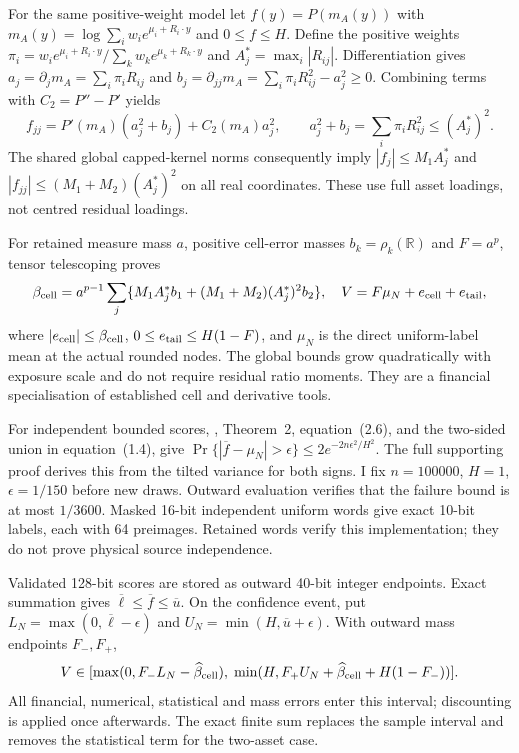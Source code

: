 \documentclass[11pt]{article}
\newcommand{\R}{\mathbb R}
\begin{document}
For the same positive-weight model let $f(y)=P(m_A(y))$ with
$m_A(y)=\log\sum_iw_i e^{\mu_i+R_i\cdot y}$ and $0\leq f\leq H$.
Define the positive weights $\pi_i=w_i e^{\mu_i+R_i\cdot y}/
\sum_kw_k e^{\mu_k+R_k\cdot y}$ and $A_j^*=\max_i|R_{ij}|$.
Differentiation gives $a_j=\partial_jm_A=\sum_i\pi_iR_{ij}$ and
$b_j=\partial_{jj}m_A=\sum_i\pi_iR_{ij}^2-a_j^2\geq0$. Combining
terms with $C_2=P''-P'$ yields
\begin{equation}
 f_{jj}=P'(m_A)(a_j^2+b_j)+C_2(m_A)a_j^2,
 \qquad a_j^2+b_j=\sum_i\pi_iR_{ij}^2\leq(A_j^*)^2.
\end{equation}
The shared global capped-kernel norms consequently imply
$|f_j|\leq M_1A_j^*$ and
$|f_{jj}|\leq(M_1+M_2)(A_j^*)^2$ on all real coordinates.
These use full asset loadings, not centred residual loadings.

For retained measure mass $a$, positive cell-error masses
$b_k=\rho_k(\R)$ and $F=a^p$, tensor telescoping proves
\begin{equation}
 \beta_{\rm cell}=a^{p-1}\sum_j
 \{M_1A_j^*b_1+(M_1+M_2)(A_j^*)^2b_2\},\quad
 V=F\mu_N+e_{\rm cell}+e_{\rm tail},
\end{equation}
where $|e_{\rm cell}|\leq\beta_{\rm cell}$,
$0\leq e_{\rm tail}\leq H(1-F)$, and $\mu_N$ is the direct
uniform-label mean at the actual rounded nodes. The global bounds grow
quadratically with exposure scale and do not require residual ratio moments.
They are a financial specialisation of established cell and derivative tools.

For independent bounded scores, \citet{hoeffding1963}, Theorem~2,
equation~(2.6), and the two-sided union in equation~(1.4), give
$\Pr\{|\overline f-\mu_N|>\epsilon\}\leq2e^{-2n\epsilon^2/H^2}$.
The full supporting proof derives this from the tilted variance for both
signs. I fix $n=100000$, $H=1$, $\epsilon=1/150$ before new draws.
Outward evaluation verifies that the failure bound is at most $1/3600$.
Masked 16-bit independent uniform words give exact 10-bit labels, each
with 64 preimages. Retained words verify this implementation; they do not
prove physical source independence.

Validated 128-bit scores are stored as outward 40-bit integer endpoints.
Exact summation gives $\overline\ell\leq\overline f\leq\overline u$.
On the confidence event, put $L_N=\max(0,\overline\ell-\epsilon)$ and
$U_N=\min(H,\overline u+\epsilon)$. With outward mass endpoints $F_-,F_+$,
\begin{equation}
 V\in[\max(0,F_-L_N-\widehat\beta_{\rm cell}),\;
 \min(H,F_+U_N+\widehat\beta_{\rm cell}+H(1-F_-))].
\end{equation}
All financial, numerical, statistical and mass errors enter this interval;
discounting is applied once afterwards. The exact finite sum replaces the
sample interval and removes the statistical term for the two-asset case.
\end{document}
